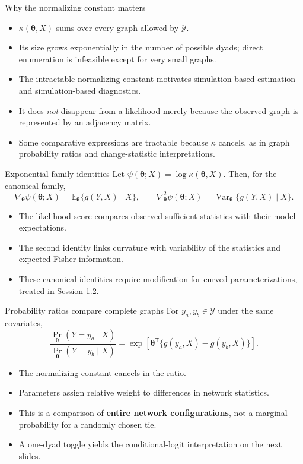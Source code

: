 \documentclass[aspectratio=169,11pt]{beamer}
\newcommand{\E}{\mathbb{E}}
\newcommand{\Var}{\operatorname{Var}}
\newcommand{\term}[1]{\textbf{\color{nupurple}#1}}
\begin{document}
\begin{frame}{Why the normalizing constant matters}
\begin{itemize}
\item $\kappa(\boldsymbol\theta,X)$ sums over every graph allowed by $\mathcal{Y}$.
\item Its size grows exponentially in the number of possible dyads; direct enumeration is infeasible except for very small graphs.
\item The intractable normalizing constant motivates simulation-based estimation and simulation-based diagnostics.
\item It does \emph{not} disappear from a likelihood merely because the observed graph is represented by an adjacency matrix.
\item Some comparative expressions are tractable because $\kappa$ cancels, as in graph probability ratios and change-statistic interpretations.
\end{itemize}
\end{frame}

\begin{frame}{Exponential-family identities}
Let $\psi(\boldsymbol\theta;X)=\log\kappa(\boldsymbol\theta,X)$. Then, for the canonical family,
\[
\nabla_{\boldsymbol\theta}\psi(\boldsymbol\theta;X)=\E_{\boldsymbol\theta}\{g(Y,X)\mid X\},
\qquad
\nabla^2_{\boldsymbol\theta}\psi(\boldsymbol\theta;X)=\Var_{\boldsymbol\theta}\{g(Y,X)\mid X\}.
\]
\begin{itemize}
\item The likelihood score compares observed sufficient statistics with their model expectations.
\item The second identity links curvature with variability of the statistics and expected Fisher information.
\item These canonical identities require modification for curved parameterizations, treated in Session 1.2.
\end{itemize}
\end{frame}

\begin{frame}{Probability ratios compare complete graphs}
For $y_a,y_b\in\mathcal{Y}$ under the same covariates,
\[
\frac{\Pr_{\boldsymbol\theta}(Y=y_a\mid X)}
{\Pr_{\boldsymbol\theta}(Y=y_b\mid X)}
=\exp\!\left[\boldsymbol\theta^{\mathsf T}\{g(y_a,X)-g(y_b,X)\}\right].
\]
\begin{itemize}
\item The normalizing constant cancels in the ratio.
\item Parameters assign relative weight to differences in network statistics.
\item This is a comparison of \term{entire network configurations}, not a marginal probability for a randomly chosen tie.
\item A one-dyad toggle yields the conditional-logit interpretation on the next slides.
\end{itemize}
\end{frame}
\end{document}
